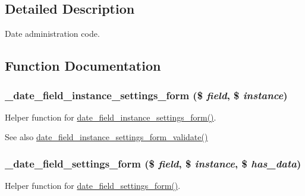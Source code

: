 \subsection{Detailed Description}
Date administration code. 

\subsection{Function Documentation}
\hypertarget{date__admin_8inc_a2492af6b02e01e06c8efea31650b1bc2}{
\subsubsection[{\_\-date\_\-field\_\-instance\_\-settings\_\-form}]{\setlength{\rightskip}{0pt plus 5cm}\_\-date\_\-field\_\-instance\_\-settings\_\-form (\$ {\em field}, \/  \$ {\em instance})}}
\label{date__admin_8inc_a2492af6b02e01e06c8efea31650b1bc2}
Helper function for \hyperlink{date_8field_8inc_a97ac17d2d8933d34f7575b0db8f226b8}{date\_\-field\_\-instance\_\-settings\_\-form()}.

\begin{DoxySeeAlso}{See also}
\hyperlink{date__admin_8inc_a4a30fe673c9a4249ac93668b8c9e7bdc}{date\_\-field\_\-instance\_\-settings\_\-form\_\-validate()} 
\end{DoxySeeAlso}
\hypertarget{date__admin_8inc_a093c2cd636fa311d4a0bf44d398f822f}{
\subsubsection[{\_\-date\_\-field\_\-settings\_\-form}]{\setlength{\rightskip}{0pt plus 5cm}\_\-date\_\-field\_\-settings\_\-form (\$ {\em field}, \/  \$ {\em instance}, \/  \$ {\em has\_\-data})}}
\label{date__admin_8inc_a093c2cd636fa311d4a0bf44d398f822f}
Helper function for \hyperlink{date_8field_8inc_a5f070593dfcf73a90c953b2402e0739b}{date\_\-field\_\-settings\_\-form()}.

